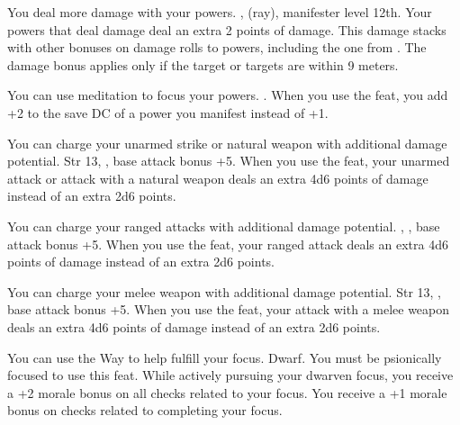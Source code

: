 
{You deal more damage with your powers.}
{,  (ray), manifester level 12th.}
{Your powers that deal damage deal an extra 2 points of damage. This damage stacks with other bonuses on damage rolls to powers, including the one from . The damage bonus applies only if the target or targets are within 9 meters.}
{}{}

{You can use meditation to focus your powers.}
{.}
{When you use the  feat, you add +2 to the save DC of a power you manifest instead of +1.}
{}{}

{You can charge your unarmed strike or natural weapon with additional damage potential.}
{Str 13, , base attack bonus +5.}
{When you use the  feat, your unarmed attack or attack with a natural weapon deals an extra 4d6 points of damage instead of an extra 2d6 points.}
{}{}

{You can charge your ranged attacks with additional damage potential.}
{, , base attack bonus +5.}
{When you use the  feat, your ranged attack deals an extra 4d6 points of damage instead of an extra 2d6 points.}
{}{}

{You can charge your melee weapon with additional damage potential.}
{Str 13, , base attack bonus +5.}
{When you use the  feat, your attack with a melee weapon deals an extra 4d6 points of damage instead of an extra 2d6 points.}
{}{}

{You can use the Way to help fulfill your focus.}
{Dwarf.}
{You must be psionically focused to use this feat. While actively pursuing your dwarven focus, you receive a +2 morale bonus on all checks related to your focus.}
{You receive a +1 morale bonus on checks related to completing your focus.}
{}


